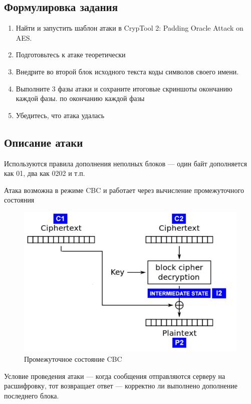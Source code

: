 \documentclass[a4paper, 14pt]{extarticle}
\begin{document}
\subsection{Формулировка задания}
\begin{enumerate}
    \item Найти и запустить шаблон атаки в CrypTool 2: Padding Oracle Attack on AES.\@
    \item Подготовьтесь к атаке теоретически
    \item  Внедрите во второй блок исходного текста коды символов своего имени.
    \item  Выполните 3 фазы атаки и сохраните итоговые скриншоты окончанию каждой фазы.  по окончанию каждой фазы
    \item Убедитесь, что атака удалась
\end{enumerate}

\subsection{Описание атаки}
Используются правила дополнения неполных блоков --- один байт дополняется как 01, два как 0202 и т.п.

Атака возможна в режиме CBC и работает через вычисление промежуточного состояния
\begin{figure}[h]
    \centering
    \includegraphics[width=\textwidth]{img/S017.jpg}
    \caption{Промежуточное состояние CBC}%
\end{figure}

Условие проведения атаки --- когда сообщения отправляются серверу на расшифровку, тот возвращает ответ --- корректно ли выполнено дополнение последнего блока.
\end{document}
